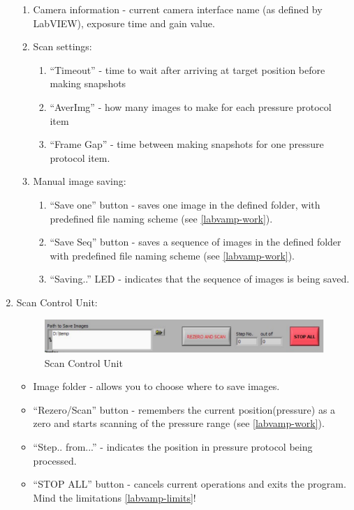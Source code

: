 \begin{enumerate}
	\begin{enumerate}
		\item Camera information - current camera interface name (as defined by LabVIEW), exposure time and gain value.
		\item Scan settings:
		\begin{enumerate}
			\item ``Timeout'' - time to wait after arriving at target position before making snapshots
			\item ``AverImg'' - how many images to make for each pressure protocol item
			\item ``Frame Gap'' - time between making snapshots for one pressure protocol item.
		\end{enumerate}
		\item Manual image saving:
		\begin{enumerate}
			\item ``Save one'' button - saves one image in the defined folder, with predefined file naming scheme (see \ref{labvamp-work}).
			\item ``Save Seq'' button - saves a sequence of images in the defined folder with predefined file naming scheme (see \ref{labvamp-work}).
			\item ``Saving..'' LED - indicates that the sequence of images is being saved.
		\end{enumerate} 
	\end{enumerate}
	
	\item Scan Control Unit:
	
	\begin{figure}[htbp]
		\centering
			\includegraphics[width=1.00\textwidth]{figs/labvamp_scan.pdf}
		\caption{Scan Control Unit}
		\label{fig:LabVAMP_scan}
	\end{figure}

	\begin{itemize}
		\item Image folder - allows you to choose where to save images.
		\item ``Rezero/Scan'' button - remembers the current position(pressure) as a zero and starts scanning of the pressure range (see \ref{labvamp-work}).
		\item ``Step.. from...'' - indicates the position in pressure protocol being processed.
		\item ``STOP ALL'' button - cancels current operations and exits the program. Mind the limitations \ref{labvamp-limits}!
	\end{itemize}
\end{enumerate}


